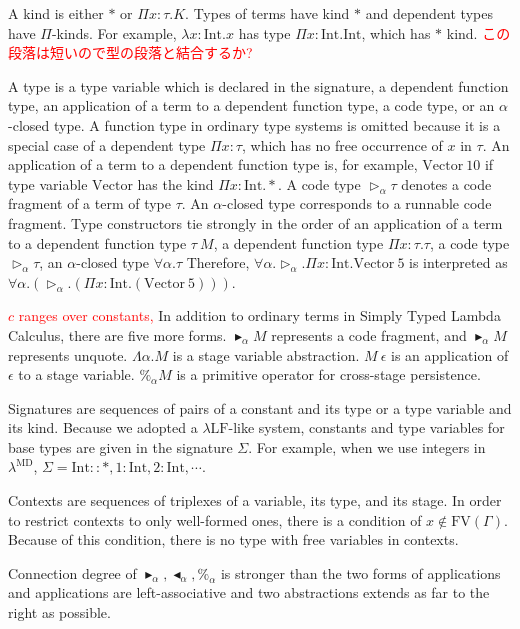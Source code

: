 \documentclass[runningheads]{llncs}
\newcommand{\red}[1]{\textcolor{red}{#1 }}
\newcommand{\LMD}{$\lambda^{\textrm{MD}}$\xspace}
\newcommand{\LLF}{$\lambda\textrm{LF}$\xspace}
\newcommand{\G}{\Gamma}
\newcommand{\TW}{\triangleright}
\newcommand{\F}{\forall}
\newcommand{\TB}{\blacktriangleright}
\newcommand{\TBL}{\blacktriangleleft}
\newcommand{\FV}{\text{FV}}
\newcommand{\I}{\textrm{Int}}
\begin{document}

A kind is either $*$ or $\Pi x:\tau.K$.
Types of terms have kind $*$ and dependent types have $\Pi$-kinds.
For example, $\lambda x:\I.x$ has type $\Pi x:\I.\I$, which has $*$ kind.
\red{この段落は短いので型の段落と結合するか?}


A type is a type variable which is declared in the signature, a dependent function type,
an application of a term to a dependent function type, a code type, or an $\alpha$-closed type.
A function type in ordinary type systems is omitted 
because it is a special case of a dependent type $\Pi x:\tau$, which has no free occurrence of $x$  in $\tau$.
An application of a term to a dependent function type is, for example, $\text{Vector}\ 10$
if type variable $\text{Vector}$ has the kind $\Pi x:\I.*$.
A code type $\TW_\alpha \tau$ denotes a code fragment of a term of type $\tau$.
An $\alpha$-closed type corresponds to a runnable code fragment.
Type constructors tie strongly in the order of 
an application of a term to a dependent function type $\tau\ M$, a dependent function type $\Pi x:\tau.\tau$, 
a code type $\TW_{\alpha} \tau$, an $\alpha$-closed type $\F\alpha.\tau$
Therefore, $\F\alpha.\TW_{\alpha}.\Pi x:\I.\text{Vector}\ 5$ is interpreted as
$\F\alpha.(\TW_{\alpha}.(\Pi x:\I.(\text{Vector}\ 5)))$.

\red{ 
$c$ ranges over constants, 
}
In addition to ordinary terms in Simply Typed Lambda Calculus, there are five more forms.
$\TB_\alpha M$ represents a code fragment, and $\TB_\alpha M$ represents unquote.
$\Lambda\alpha.M$ is a stage variable abstraction.
$M\ \epsilon$ is an application of $\epsilon$ to a stage variable.
$\%_\alpha M$ is a primitive operator for cross-stage persistence.

Signatures are sequences of pairs of a constant and its type or a type variable and its kind.
Because we adopted a \LLF-like system, constants and type variables for base types are given in the signature $\Sigma$.
For example, when we use integers in \LMD, $\Sigma = \I :: *, 1:\I, 2:\I, \cdots$.

Contexts are sequences of triplexes of a variable, its type, and its stage.
In order to restrict contexts to only well-formed ones, there is a condition of $x\notin\FV(\G)$.
Because of this condition, there is no type with free variables in contexts.

Connection degree of $\TB_\alpha, \TBL_\alpha, \%_\alpha$ is stronger than the two forms of applications
and applications are left-associative
and two abstractions extends as far to the right as possible.
\end{document}
